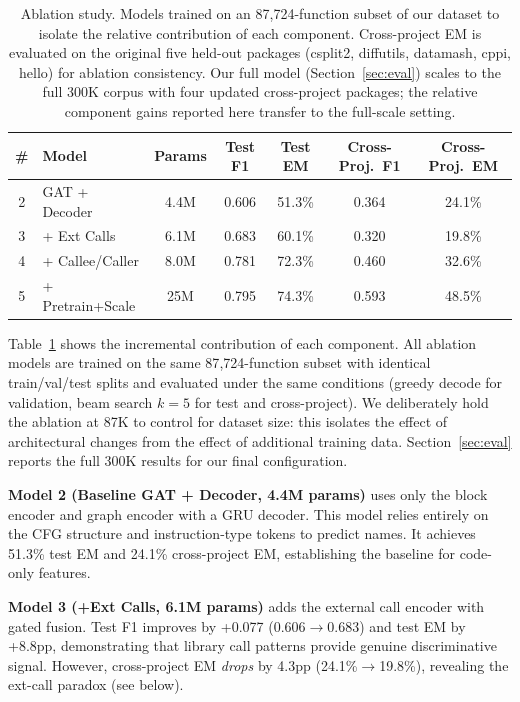 \documentclass[sigconf,nonacm]{acmart}
\begin{document}
\begin{table}[t]
    \centering
    \caption{Ablation study. Models trained on an 87{,}724-function subset of our dataset to isolate the relative contribution of each component. Cross-project EM is evaluated on the original five held-out packages (csplit2, diffutils, datamash, cppi, hello) for ablation consistency. Our full model (Section~\ref{sec:eval}) scales to the full 300K corpus with four updated cross-project packages; the relative component gains reported here transfer to the full-scale setting.}
    \label{tab:ablation}
    \footnotesize
    \setlength{\tabcolsep}{4pt}
    \begin{tabular}{clccccc}
        \toprule
        \textbf{\#} & \textbf{Model} & \textbf{Params} & \textbf{Test F1} & \textbf{Test EM} & \textbf{Cross-Proj.\ F1} & \textbf{Cross-Proj.\ EM} \\
        \midrule
        2 & GAT + Decoder & 4.4M & 0.606 & 51.3\% & 0.364 & 24.1\% \\
        3 & + Ext Calls & 6.1M & 0.683 & 60.1\% & 0.320 & 19.8\% \\
        4 & + Callee/Caller & 8.0M & 0.781 & 72.3\% & 0.460 & 32.6\% \\
        5 & + Pretrain+Scale & 25M & 0.795 & 74.3\% & 0.593 & 48.5\% \\
        \bottomrule
    \end{tabular}
\end{table}

Table~\ref{tab:ablation} shows the incremental contribution of each component. All ablation models are trained on the same 87{,}724-function subset with identical train/val/test splits and evaluated under the same conditions (greedy decode for validation, beam search $k{=}5$ for test and cross-project). We deliberately hold the ablation at 87K to control for dataset size: this isolates the effect of architectural changes from the effect of additional training data. Section~\ref{sec:eval} reports the full 300K results for our final configuration.

\textbf{Model 2 (Baseline GAT + Decoder, 4.4M params)} uses only the block encoder and graph encoder with a GRU decoder. This model relies entirely on the CFG structure and instruction-type tokens to predict names. It achieves 51.3\% test EM and 24.1\% cross-project EM, establishing the baseline for code-only features.

\textbf{Model 3 (+Ext Calls, 6.1M params)} adds the external call encoder with gated fusion. Test F1 improves by +0.077 (0.606$\to$0.683) and test EM by +8.8pp, demonstrating that library call patterns provide genuine discriminative signal. However, cross-project EM \emph{drops} by 4.3pp (24.1\%$\to$19.8\%), revealing the ext-call paradox (see below).
\end{document}
